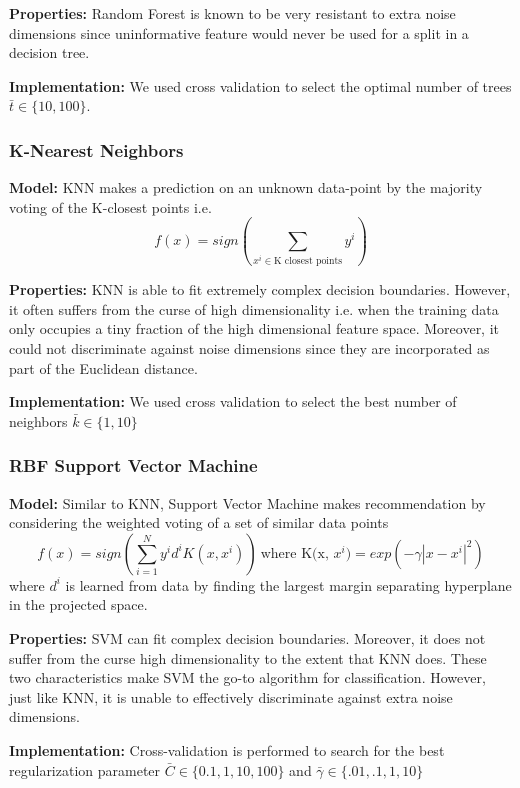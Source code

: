 \documentclass{article}
\begin{document}
\textbf{Properties:}
Random Forest is known to be very resistant to extra noise dimensions since
uninformative feature would never be used for a split in a decision tree.

\textbf{Implementation:}
We used cross validation to select the optimal number of trees $\bar{t} \in
\{10, 100\}$.

\subsubsection*{K-Nearest Neighbors}
\textbf{Model:}
KNN makes a prediction on an unknown data-point by the majority voting of the
K-closest points i.e. $$f(x) = sign(\sum_{x^i \in \text{K closest points}} y^i)
$$

\textbf{Properties:}
KNN is able to fit extremely complex decision boundaries. However, it often
suffers from the curse of high dimensionality i.e. when the training data only
occupies a tiny fraction of the high dimensional feature space. Moreover, it
could not discriminate against noise dimensions since they are incorporated as
part of the Euclidean distance.

\textbf{Implementation:}
We used cross validation to select the best number of neighbors $\bar{k} \in
\{1, 10\}$




\subsubsection*{RBF Support Vector Machine}
\textbf{Model:}
Similar to KNN, Support Vector Machine makes recommendation by considering the
weighted voting of a set of similar data points
$$
f(x)
= sign(\sum_{i=1}^{N} y^i d^i K(x, x^i))\ \text{where K(x, $x^i$)}
= exp(-\gamma|x - x^i|^2)
$$
where $d^i$ is learned from data by finding the largest margin separating
hyperplane in the projected space.

\textbf{Properties:}
SVM can fit complex decision boundaries. Moreover, it does not suffer from the
curse high dimensionality to the extent that KNN does. These two
characteristics make SVM the go-to algorithm for classification. However, just
like KNN, it is unable to effectively discriminate against extra noise
dimensions.

\textbf{Implementation:}
Cross-validation is performed to search for the best regularization parameter
$\bar{C} \in \{0.1, 1, 10, 100\}$ and $\bar{\gamma} \in \{.01, .1, 1, 10\}$
\end{document}
